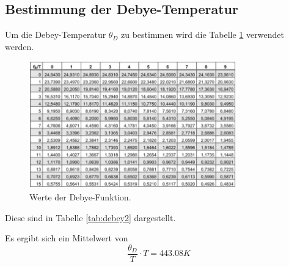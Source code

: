 \subsection{Bestimmung der Debye-Temperatur}
Um die Debey-Temperatur $\theta_D$ zu bestimmen wird die Tabelle \ref{tab:debey} verwendet werden.
\begin{figure}[h] 
    \centering
       \includegraphics[width=0.8\textwidth]{Tabellen/debey.JPG}
    \caption{Werte der Debye-Funktion.}
    \label{tab:debey}
\end{figure}
Diese sind in Tabelle \ref{tab:debey2} dargestellt.

Es ergibt sich ein Mittelwert von
\begin{equation*}
    \frac{\theta_D}{T}\cdot T =  443.08 K
\end{equation*}

